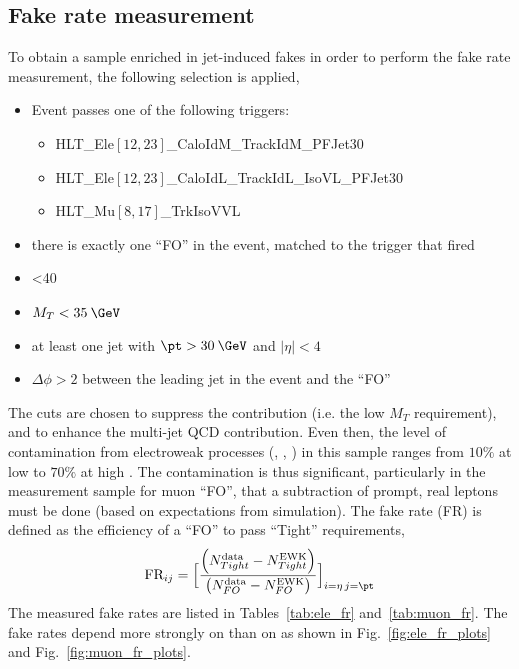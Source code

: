 \subsection{Fake rate measurement}
\label{subsec:fr_measure}
To obtain a sample enriched in jet-induced fakes in order to perform the fake rate measurement, the following selection is applied,
\begin{itemize}
\item Event passes one of the following triggers:
  \begin{itemize}
  \item HLT\_Ele$[12, 23]$\_CaloIdM\_TrackIdM\_PFJet30
  \item HLT\_Ele$[12, 23]$\_CaloIdL\_TrackIdL\_IsoVL\_PFJet30
  \item HLT\_Mu$[8, 17]$\_TrkIsoVVL
  \end{itemize}
\item there is exactly one ``FO'' in the event, matched to the trigger that fired
\item \ptmiss<40\:\GeV
\item $M_{T}<35\:\GeV$
\item at least one jet with $\pt>30\:\GeV$ and $|\eta|<4$
\item $\Delta\phi>2$ between the leading jet in the event and the ``FO''
\end{itemize}
The cuts are chosen to suppress the \Wjets contribution (i.e. the low $M_{T}$ requirement), and to enhance the multi-jet QCD contribution. Even then, the level of contamination from electroweak processes (\Wjets, \Zjets, \ttbar) in this sample ranges from $10\%$ at low \pt to $70\%$ at high \pt. The contamination is thus significant, particularly in the measurement sample for muon ``FO'', that a subtraction of prompt, real leptons must be done (based on expectations from simulation). The fake rate (FR) is defined as the efficiency of a ``FO'' to pass ``Tight'' requirements,
\begin{equation}
  \text{FR}_{ij} = \Big[\frac{\left(N^{\text{data}}_{Tight} - N^{\text{EWK}}_{Tight}\right)}{\left(N^{\text{data}}_{FO} - N^{\text{EWK}}_{FO}\right)}\Big]_{i=\eta\,j=\pt}
\end{equation}
The measured fake rates are listed in Tables~\ref{tab:ele_fr} and~\ref{tab:muon_fr}. The fake rates depend more strongly on \eta than on \pt as shown in Fig.~\ref{fig:ele_fr_plots} and Fig.~\ref{fig:muon_fr_plots}.

